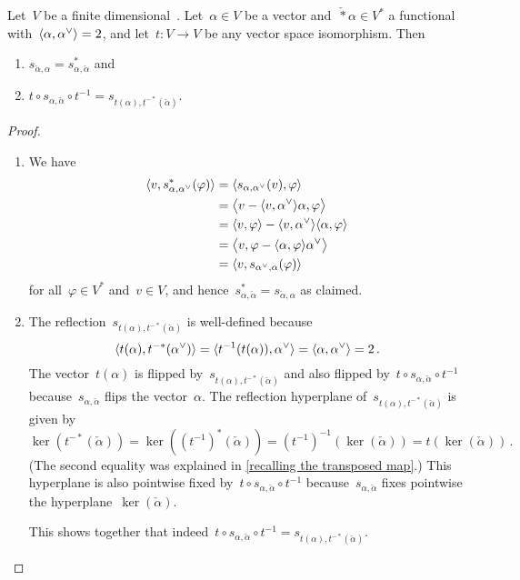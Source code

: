 \begin{lemma}
  \label{properties of reflections}
  Let~$V$ be a finite dimensional~{\vectorspace{$\kf$}}.
  Let~$\alpha \in V$ be a vector and~$\check*{\alpha} \in V^*$ a functional with~$\pair{\alpha, \check{\alpha}} = 2$, and let~$t \colon V \to V$ be any vector space isomorphism.
  Then
  \begin{enumerate}
    \item
      $s_{\check{\alpha}, \alpha} = s_{\alpha, \check{\alpha}}^*$ and
    \item
      $t \circ s_{\alpha, \check{\alpha}} \circ t^{-1} = s_{t(\alpha), t^{-*}(\check{\alpha})}$.
  \end{enumerate}
\end{lemma}


\begin{proof}
  \leavevmode
  \begin{enumerate}
    \item
      We have
      \begin{align*}
        \pair{v, s_{\alpha, \check{\alpha}}^*(\varphi)}
        &=
        \pair{s_{\alpha, \check{\alpha}}(v), \varphi}
        \\
        &=
        \pair[\big]{v - \pair{v, \check{\alpha}} \alpha, \varphi}
        \\
        &=
        \pair{v, \varphi} - \pair{v, \check{\alpha}} \pair{\alpha, \varphi}
        \\
        &=
        \pair[\big]{v, \varphi - \pair{\alpha, \varphi} \check{\alpha}}
        \\
        &=
        \pair{v, s_{\check{\alpha}, \alpha}(\varphi)}
      \end{align*}
       for all~$\varphi \in V^*$ and~$v \in V$, and hence~$s_{\alpha, \check{\alpha}}^* = s_{\check{\alpha}, \alpha}$ as claimed.
    \item
      The reflection~$s_{t(\alpha), t^{-*}(\check{\alpha})}$ is well-defined because
      \[
        \pair{t(\alpha), t^{-*}(\check{\alpha})}
        =
        \pair{t^{-1}(t(\alpha)), \check{\alpha}}
        =
        \pair{\alpha, \check{\alpha}}
        =
        2 \,.
      \]
      The vector~$t(\alpha)$ is flipped by~$s_{t(\alpha), t^{-*}(\check{\alpha})}$ and also flipped by~$t \circ s_{\alpha, \check{\alpha}} \circ t^{-1}$ because~$s_{\alpha, \check{\alpha}}$ flips the vector~$\alpha$.
      The reflection hyperplane of~$s_{t(\alpha), t^{-*}(\check{\alpha})}$ is given by
      \[
        \ker(t^{-*}(\check{\alpha}))
        =
        \ker((t^{-1})^*(\check{\alpha}))
        =
        (t^{-1})^{-1}(\ker(\check{\alpha}))
        =
        t(\ker(\check{\alpha})) \,.
      \]
      (The second equality was explained in \cref{recalling the transposed map}.)
      This hyperplane is also pointwise fixed by~$t \circ s_{\alpha, \check{\alpha}} \circ t^{-1}$ because~$s_{\alpha, \check{\alpha}}$ fixes pointwise the hyperplane~$\ker(\check{\alpha})$.
      
      This shows together that indeed~$t \circ s_{\alpha, \check{\alpha}} \circ t^{-1} = s_{t(\alpha), t^{-*}(\check{\alpha})}$.
    \qedhere
  \end{enumerate}
\end{proof}
